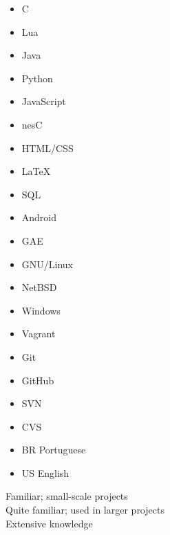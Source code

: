 \documentclass[a4paper,10pt]{article}
\begin{document}
\begin{multicols}{3}
  \begin{itemize}
    \renewcommand{\labelitemi}{\textcolor{lightg}{\symbol{"00BB}}}
    \setlength{\itemsep}{1pt}
    \setlength{\parskip}{0pt}
    \setlength{\parsep}{0pt}
  \item C \hfill \threenotes 
  \item Lua \hfill \threenotes
  \item Java \hfill \twonotes
  \item Python \hfill \twonotes
  \item JavaScript \hfill \twonotes
  \item nesC \hfill \onenote
  \item HTML/CSS \hfill \twonotes
  \item \LaTeX \hfill \onenote
  \item SQL \hfill \twonotes
  \item Android \hfill \twonotes
  \item GAE \hfill \twonotes
  \item GNU/Linux \hfill \threenotes
  \item NetBSD \hfill \twonotes
  \item Windows \hfill \onenote
  \item Vagrant \hfill \twonotes
  \item Git \hfill \twonotes
  \item GitHub \hfill \twonotes
  \item SVN \hfill \onenote
  \item CVS \hfill \onenote
  \item BR Portuguese \hfill \twonotes
  \item US English \hfill \twonotes
  \end{itemize} 
\end{multicols}

\vspace{1em}

\begin{center}
\parbox[c]{8cm}{
  \onenote Familiar; small-scale projects \\
  \twonotes Quite familiar; used in larger projects \\
  \threenotes Extensive knowledge
}
\end{center}
\end{document}
